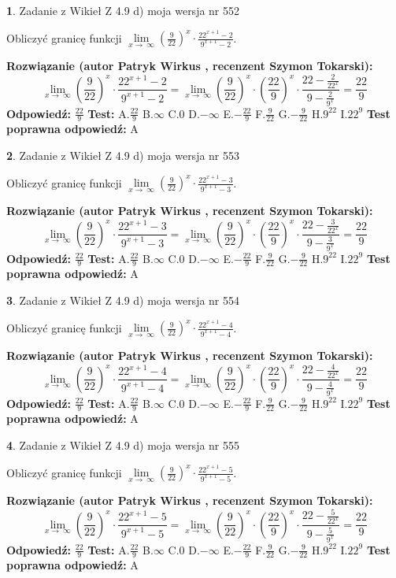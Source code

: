 \documentclass[12pt, a4paper]{article}
\theoremstyle{definition} %
\newtheorem{zad}{}
\newcommand{\zadStart}[1]{\begin{zad}#1\newline}
\newcommand{\zadStop}{\end{zad}}
\newcommand{\rozwStart}[2]{\noindent \textbf{Rozwiązanie (autor #1 , recenzent #2): }\newline}
\newcommand{\rozwStop}{\newline}
\newcommand{\odpStart}{\noindent \textbf{Odpowiedź:}\newline}
\newcommand{\odpStop}{\newline}
\newcommand{\testStart}{\noindent \textbf{Test:}\newline}
\newcommand{\testStop}{\newline}
\newcommand{\kluczStart}{\noindent \textbf{Test poprawna odpowiedź:}\newline}
\newcommand{\kluczStop}{\newline}
\begin{document}
\zadStart{Zadanie z Wikieł Z 4.9 d) moja wersja nr 552}


Obliczyć granicę funkcji  $\lim\limits_{x\to\ \infty}(\frac{9}{22})^{x}\cdot\frac{22^{x+1}-2}{9^{x+1}-2}$.
\zadStop
\rozwStart{Patryk Wirkus}{Szymon Tokarski}
$$\lim\limits_{x\to\ \infty}(\frac{9}{22})^{x}\cdot\frac{22^{x+1}-2}{9^{x+1}-2}=\lim\limits_{x\to\ \infty}(\frac{9}{22})^{x}\cdot(\frac{22}{9})^{x} \cdot \frac{22-\frac{2}{22^{x}}}{9-\frac{2}{9^{x}}} = \frac{22}{9}$$
\rozwStop
\odpStart
$\frac{22}{9}$
\odpStop
\testStart
A.$\frac{22}{9}$ B.$\infty$ C.$0$ D.$-\infty$ E.$-\frac{22}{9}$
F.$\frac{9}{22}$ G.$-\frac{9}{22}$
H.$9^{22}$
I.$22^{9}$
\testStop
\kluczStart
A
\kluczStop



\zadStart{Zadanie z Wikieł Z 4.9 d) moja wersja nr 553}


Obliczyć granicę funkcji  $\lim\limits_{x\to\ \infty}(\frac{9}{22})^{x}\cdot\frac{22^{x+1}-3}{9^{x+1}-3}$.
\zadStop
\rozwStart{Patryk Wirkus}{Szymon Tokarski}
$$\lim\limits_{x\to\ \infty}(\frac{9}{22})^{x}\cdot\frac{22^{x+1}-3}{9^{x+1}-3}=\lim\limits_{x\to\ \infty}(\frac{9}{22})^{x}\cdot(\frac{22}{9})^{x} \cdot \frac{22-\frac{3}{22^{x}}}{9-\frac{3}{9^{x}}} = \frac{22}{9}$$
\rozwStop
\odpStart
$\frac{22}{9}$
\odpStop
\testStart
A.$\frac{22}{9}$ B.$\infty$ C.$0$ D.$-\infty$ E.$-\frac{22}{9}$
F.$\frac{9}{22}$ G.$-\frac{9}{22}$
H.$9^{22}$
I.$22^{9}$
\testStop
\kluczStart
A
\kluczStop



\zadStart{Zadanie z Wikieł Z 4.9 d) moja wersja nr 554}


Obliczyć granicę funkcji  $\lim\limits_{x\to\ \infty}(\frac{9}{22})^{x}\cdot\frac{22^{x+1}-4}{9^{x+1}-4}$.
\zadStop
\rozwStart{Patryk Wirkus}{Szymon Tokarski}
$$\lim\limits_{x\to\ \infty}(\frac{9}{22})^{x}\cdot\frac{22^{x+1}-4}{9^{x+1}-4}=\lim\limits_{x\to\ \infty}(\frac{9}{22})^{x}\cdot(\frac{22}{9})^{x} \cdot \frac{22-\frac{4}{22^{x}}}{9-\frac{4}{9^{x}}} = \frac{22}{9}$$
\rozwStop
\odpStart
$\frac{22}{9}$
\odpStop
\testStart
A.$\frac{22}{9}$ B.$\infty$ C.$0$ D.$-\infty$ E.$-\frac{22}{9}$
F.$\frac{9}{22}$ G.$-\frac{9}{22}$
H.$9^{22}$
I.$22^{9}$
\testStop
\kluczStart
A
\kluczStop



\zadStart{Zadanie z Wikieł Z 4.9 d) moja wersja nr 555}


Obliczyć granicę funkcji  $\lim\limits_{x\to\ \infty}(\frac{9}{22})^{x}\cdot\frac{22^{x+1}-5}{9^{x+1}-5}$.
\zadStop
\rozwStart{Patryk Wirkus}{Szymon Tokarski}
$$\lim\limits_{x\to\ \infty}(\frac{9}{22})^{x}\cdot\frac{22^{x+1}-5}{9^{x+1}-5}=\lim\limits_{x\to\ \infty}(\frac{9}{22})^{x}\cdot(\frac{22}{9})^{x} \cdot \frac{22-\frac{5}{22^{x}}}{9-\frac{5}{9^{x}}} = \frac{22}{9}$$
\rozwStop
\odpStart
$\frac{22}{9}$
\odpStop
\testStart
A.$\frac{22}{9}$ B.$\infty$ C.$0$ D.$-\infty$ E.$-\frac{22}{9}$
F.$\frac{9}{22}$ G.$-\frac{9}{22}$
H.$9^{22}$
I.$22^{9}$
\testStop
\kluczStart
A
\kluczStop
\end{document}
